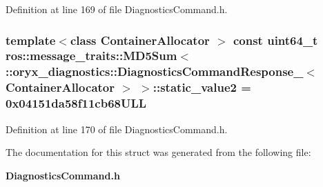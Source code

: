\-Definition at line 169 of file \-Diagnostics\-Command.\-h.

\subsubsection[{static\-\_\-value2}]{\setlength{\rightskip}{0pt plus 5cm}template$<$class Container\-Allocator $>$ const uint64\-\_\-t ros\-::message\-\_\-traits\-::\-M\-D5\-Sum$<$ \-::{\bf oryx\-\_\-diagnostics\-::\-Diagnostics\-Command\-Response\-\_\-}$<$ \-Container\-Allocator $>$ $>$\-::{\bf static\-\_\-value2} = 0x04151da58f11cb68\-U\-L\-L\hspace{0.3cm}{\ttfamily  [static]}}\label{structros_1_1message__traits_1_1MD5Sum_3_01_1_1oryx__diagnostics_1_1DiagnosticsCommandResponse__9e7bcf2762b7d31617ca49cd941f436d_a8320ed6941e86a65926104b20271780c}


\-Definition at line 170 of file \-Diagnostics\-Command.\-h.



\-The documentation for this struct was generated from the following file\-:\begin{DoxyCompactItemize}
\item 
{\bf \-Diagnostics\-Command.\-h}\end{DoxyCompactItemize}
